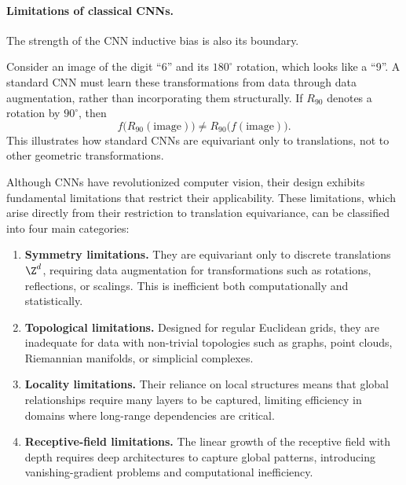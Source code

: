 \paragraph{Limitations of classical CNNs.}
The strength of the CNN inductive bias is also its boundary.

\begin{example}
\label{ex:grids:no-rotation}
Consider an image of the digit ``6'' and its $180^\circ$ rotation, which looks
like a ``9''. A standard CNN must learn these transformations from data through
data augmentation, rather than incorporating them structurally. If $R_{90}$
denotes a rotation by $90^\circ$, then
\[
  f\big(R_{90}(\text{image})\big) \neq R_{90}\big(f(\text{image})\big).
\]
This illustrates how standard CNNs are equivariant only to translations, not to
other geometric transformations.
\end{example}

Although CNNs have revolutionized computer vision, their design exhibits
fundamental limitations that restrict their applicability. These limitations,
which arise directly from their restriction to translation equivariance, can be
classified into four main categories:
\begin{enumerate}
  \item \textbf{Symmetry limitations.} They are equivariant only to discrete
    translations $\Z^d$, requiring data augmentation for transformations such as
    rotations, reflections, or scalings. This is inefficient both
    computationally and statistically.
  \item \textbf{Topological limitations.} Designed for regular Euclidean grids,
    they are inadequate for data with non-trivial topologies such as graphs,
    point clouds, Riemannian manifolds, or simplicial complexes.
  \item \textbf{Locality limitations.} Their reliance on local structures means
    that global relationships require many layers to be captured, limiting
    efficiency in domains where long-range dependencies are critical.
  \item \textbf{Receptive-field limitations.} The linear growth of the receptive
    field with depth requires deep architectures to capture global patterns,
    introducing vanishing-gradient problems and computational inefficiency.
\end{enumerate}

